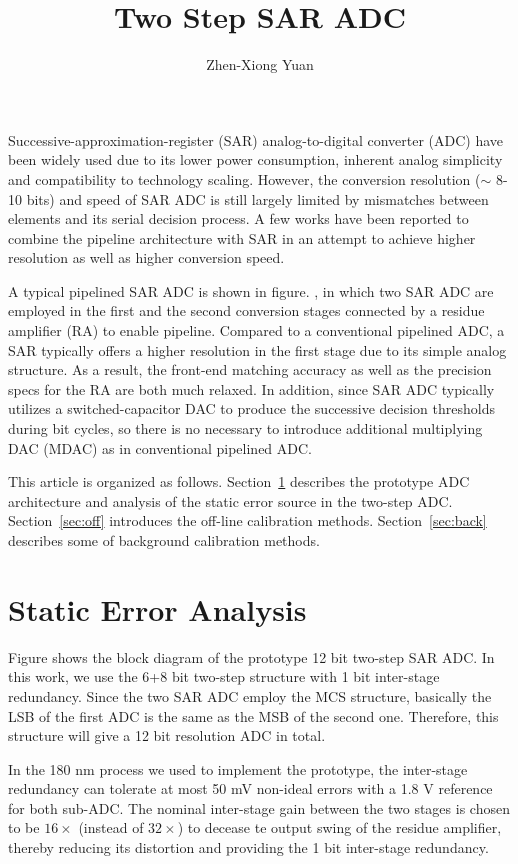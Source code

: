 \documentclass[12pt,a4paper]{article}
\author{Zhen-Xiong Yuan}
\begin{document}
\title{Two Step SAR ADC} \maketitle
Successive-approximation-register (SAR) analog-to-digital converter (ADC) have been widely used due to its lower power consumption, inherent analog simplicity and compatibility to technology scaling. However, the conversion resolution ($\sim$ 8-10 bits) and speed of SAR ADC is still largely limited by mismatches between elements and its serial decision process. A few works have been reported to combine the pipeline architecture with SAR in an attempt to achieve higher resolution as well as higher conversion speed. 

A typical pipelined SAR ADC is shown in figure. , in which two SAR ADC are employed in the first and the second conversion stages connected by a residue amplifier (RA) to enable pipeline. Compared to a conventional pipelined ADC, a SAR typically offers a higher resolution in the first stage due to its simple analog structure. As a result, the front-end matching accuracy as well as the precision specs for the RA are both much relaxed. In addition, since SAR ADC typically utilizes a switched-capacitor DAC to produce the successive decision thresholds during bit cycles, so there is no necessary to introduce additional multiplying DAC (MDAC) as in conventional pipelined ADC.

This article is organized as follows. Section~\ref{sec:error} describes the prototype ADC architecture and analysis of the static error source in the two-step ADC. Section~\ref{sec:off} introduces the off-line calibration methods. Section~\ref{sec:back} describes some of background calibration methods. 

\section{Static Error Analysis}\label{sec:error}
Figure shows the block diagram of the prototype 12 bit two-step SAR ADC. In this work, we use the 6+8 bit two-step structure with 1 bit inter-stage redundancy. Since the two SAR ADC employ the MCS structure, basically the LSB of the first ADC is the same as the MSB of the second one.  Therefore, this structure will give a 12 bit resolution ADC in total.

In the 180 nm process we used to implement the prototype, the inter-stage redundancy can tolerate at most 50 mV non-ideal errors with a 1.8 V reference for both sub-ADC. The nominal inter-stage gain between the two stages is chosen to be $16\times$ (instead of $32\times$) to decease te output swing of the residue amplifier, thereby reducing its distortion and providing the 1 bit inter-stage redundancy.
\end{document}
